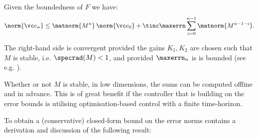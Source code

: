 Given the boundedness of $F$ we have: \vspace{-1em}
\begin{equation}
	\norm{\vc e_n} \leq   \matnorm{M^{n}} \, \norm{\vc e_0} + \tinc \maxerrn \sum_{i=0}^{n-1}  \matnorm{M^{n-1-i}}.
\end{equation}

The right-hand side is convergent provided the gains $K_1, K_2$ are chosen such that $M$ is stable, i.e. $\specrad(M) <1$, and provided $\maxerrn_n$ is is bounded (see e.g. \cite{calliess2014_thesis}). 

Whether or not $M$ is stable, in low dimensions, the sums can be computed offline and in advance. This is of great benefit if 
 the controller that is building on the error bounds is utilising optimisation-based control with a finite time-horizon.   

To obtain a (conservative) closed-form bound on the error norms \cite{calliess2014_thesis}
contains a derivation and discussion of the following result:

